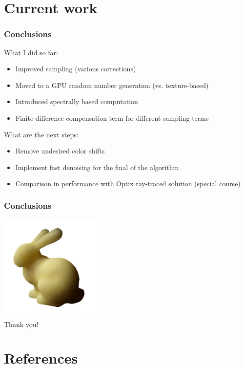 \documentclass{beamer}
\begin{document}
\section{Current work}
\begin{frame}
    \frametitle{Conclusions}
What I did so far:
\begin{itemize}
\item Improved sampling (various corrections)
\item Moved to a GPU random number generation (vs. texture-based)
\item Introduced spectrally based computation
\item Finite difference compensation term for different sampling terms
\end{itemize}
What are the next steps:
\begin{itemize}
\item Remove undesired color shifts
\item Implement fast denoising for the final of the algorithm
\item Comparison in performance with Optix ray-traced solution (special course)
\end{itemize}

\end{frame}

\begin{frame}
    \frametitle{Conclusions}
\centering
\includegraphics[width=0.4\textwidth]{front} \\
\huge Thank you!
\end{frame}

\section{References}
\end{document}
